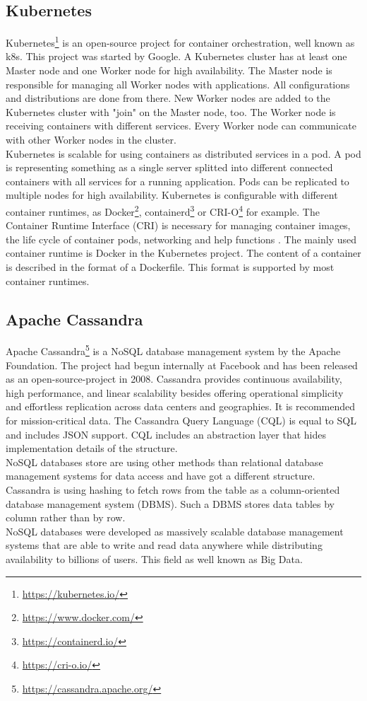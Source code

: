 \subsection{Kubernetes}

Kubernetes\footnote{\url{https://kubernetes.io/}} is an open-source project for container orchestration, well known as k8s. This project was started by Google. A Kubernetes cluster has at least one Master node and one Worker node for high availability. The Master node is responsible for managing all Worker nodes with applications. All configurations and distributions are done from there. New Worker nodes are added to the Kubernetes cluster with "join" on the Master node, too. The Worker node is receiving containers with different services. Every Worker node can communicate with other Worker nodes in the cluster. \\
Kubernetes is scalable for using containers as distributed services in a pod. A pod is representing something as a single server splitted into different connected containers with all services for a running application. Pods can be replicated to multiple nodes for high availability. Kubernetes is configurable with different container runtimes, as Docker\footnote{\url{https://www.docker.com/}}, containerd\footnote{\url{https://containerd.io/}} or CRI-O\footnote{\url{https://cri-o.io/}} for example. The Container Runtime Interface (CRI) is necessary for managing container images, the life cycle of container pods, networking and help functions \cite[~p.16]{Scholl2019}. The mainly used container runtime is Docker in the Kubernetes project. The content of a container is described in the format of a Dockerfile. This format is supported by most container runtimes.


\subsection{Apache Cassandra}

Apache Cassandra\footnote{\url{https://cassandra.apache.org/}} is a NoSQL database management system by the Apache Foundation. The project had begun internally at Facebook and has been released as an open-source-project in 2008. Cassandra provides continuous availability, high performance, and linear scalability besides  offering operational simplicity and effortless replication across data centers and geographies\cite{Datastax}. It is recommended for mission-critical data. The Cassandra Query Language (CQL) is equal to SQL and includes JSON support. CQL includes an abstraction layer that hides implementation details of the structure.  \\
NoSQL databases store are using other methods than relational database management systems for data access and have got a different structure. Cassandra is using hashing to fetch rows from the table as a column-oriented database management system (DBMS). Such a DBMS stores data tables by column rather than by row. \\ 
NoSQL databases were developed as massively scalable database management systems that are able to write and read data anywhere while distributing availability to billions of users. This field as well known as Big Data.
